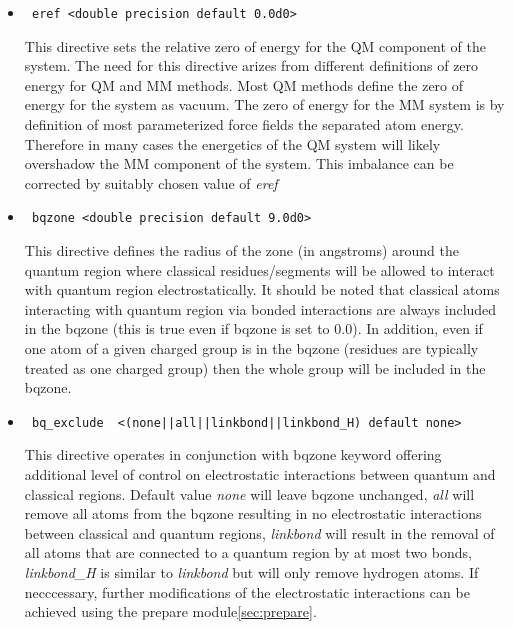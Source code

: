 \begin{itemize}

\item
\begin{verbatim}
 eref <double precision default 0.0d0>
\end{verbatim}

This directive sets the relative zero of energy for the
QM component of the system. The need for this directive
arizes from different definitions of zero energy for QM and MM methods.
Most QM methods define the zero of energy for the system as
vacuum. The zero of energy for the MM system is by
definition of most parameterized force fields the separated atom
energy. Therefore in many cases the energetics of the QM system 
will likely overshadow the
MM component of the system. This imbalance can be corrected by
suitably chosen value of {\it eref}

\item
\begin{verbatim}
 bqzone <double precision default 9.0d0>
\end{verbatim}

This directive defines the radius of the zone (in angstroms) around the quantum region
where classical residues/segments
will be allowed to interact with quantum region electrostatically. It should be noted
that classical atoms interacting with quantum region via bonded interactions are always
included in the bqzone (this is true even if bqzone is set to $0.0$). In addition, even if one atom
of a given charged group is in the bqzone (residues are typically treated as one charged group) then the whole
group will be included in the bqzone.


\item
\begin{verbatim}
 bq_exclude  <(none||all||linkbond||linkbond_H) default none>
\end{verbatim}

This directive operates in conjunction with bqzone keyword offering additional level of control
on electrostatic interactions between quantum and classical regions. Default value {\it none} will
leave bqzone unchanged, {\it all} will remove all atoms from the bqzone resulting in 
no electrostatic interactions between 
classical and quantum regions, 
{\it linkbond} will result in the removal of all atoms that are connected to a quantum region
by at most two bonds,
{\it linkbond{\_}H} is similar to {\it linkbond} but will only remove hydrogen atoms.
If necccessary, further modifications of the electrostatic interactions can be achieved 
using the prepare module{\ref{sec:prepare}}.


\end{itemize}
